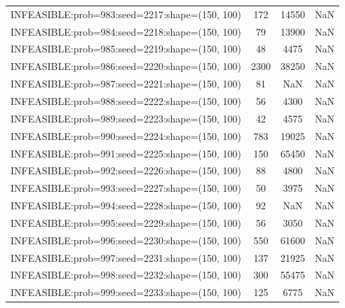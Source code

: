 \begin{longtable}{lccc}
INFEASIBLE:prob=983:seed=2217:shape=(150, 100) &   172 & 14550 &    NaN \\
INFEASIBLE:prob=984:seed=2218:shape=(150, 100) &    79 & 13900 &    NaN \\
INFEASIBLE:prob=985:seed=2219:shape=(150, 100) &    48 &  4475 &    NaN \\
INFEASIBLE:prob=986:seed=2220:shape=(150, 100) &  2300 & 38250 &    NaN \\
INFEASIBLE:prob=987:seed=2221:shape=(150, 100) &    81 &   NaN &    NaN \\
INFEASIBLE:prob=988:seed=2222:shape=(150, 100) &    56 &  4300 &    NaN \\
INFEASIBLE:prob=989:seed=2223:shape=(150, 100) &    42 &  4575 &    NaN \\
INFEASIBLE:prob=990:seed=2224:shape=(150, 100) &   783 & 19025 &    NaN \\
INFEASIBLE:prob=991:seed=2225:shape=(150, 100) &   150 & 65450 &    NaN \\
INFEASIBLE:prob=992:seed=2226:shape=(150, 100) &    88 &  4800 &    NaN \\
INFEASIBLE:prob=993:seed=2227:shape=(150, 100) &    50 &  3975 &    NaN \\
INFEASIBLE:prob=994:seed=2228:shape=(150, 100) &    92 &   NaN &    NaN \\
INFEASIBLE:prob=995:seed=2229:shape=(150, 100) &    56 &  3050 &    NaN \\
INFEASIBLE:prob=996:seed=2230:shape=(150, 100) &   550 & 61600 &    NaN \\
INFEASIBLE:prob=997:seed=2231:shape=(150, 100) &   137 & 21925 &    NaN \\
INFEASIBLE:prob=998:seed=2232:shape=(150, 100) &   300 & 55475 &    NaN \\
INFEASIBLE:prob=999:seed=2233:shape=(150, 100) &   125 &  6775 &    NaN \\
\end{longtable}
